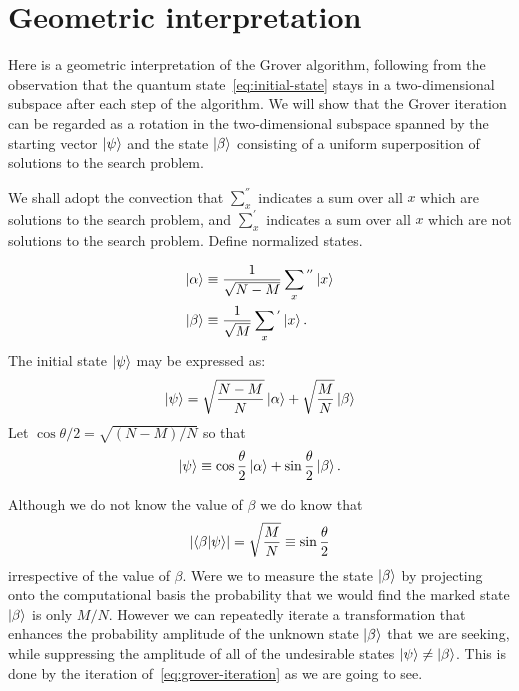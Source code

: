 \section{Geometric interpretation}\label{sec:geometric-interpretation}
Here is a geometric interpretation of the Grover algorithm, following from the observation that the quantum state~\ref{eq:initial-state} stays in a two-dimensional subspace after each step of the algorithm. We will show that the Grover iteration can be regarded as a rotation in the two-dimensional subspace spanned by the starting vector $\ket{\psi}$ and the state $\ket{\beta}$ consisting of a uniform superposition of solutions to the search problem. 

We shall adopt the convection that $\sum_{x}^{''}$ indicates a sum over all $x$ which are solutions to the search problem, and $\sum_{x}^{'}$ indicates a sum over all $x$ which are not solutions to the search problem. Define normalized states.

\begin{equation*}
\begin{split}
 \ket{\alpha} &\equiv \frac{1}{\sqrt{N-M}} \sum_{x}{}^{''} \ket{x} \\
 \ket{\beta} &\equiv \frac{1}{\sqrt{M}} \sum_{x}{}^{'} \ket{x}.
\end{split}
\end{equation*}
The initial state $\ket{\psi}$ may be expressed as:
\begin{equation*}
    \ket{\psi} = \sqrt{\frac{N-M}{N}} \ket{\alpha} + \sqrt{\frac{M}{N}} \ket{\beta}
\end{equation*}
 Let $\cos\theta/2 = \sqrt{(N-M)/N}$ so that 
 \begin{equation*}
 \ket{\psi} \equiv \cos\frac{\theta}{2}\ket{\alpha} + \sin\frac{\theta}{2}\ket{\beta}.
 \end{equation*}
 
Although we do not know the value of $\beta$ we do know that 
\begin{equation}
    \lvert\braket{\beta | \psi}\rvert = \sqrt{\frac{M}{N}} \equiv \sin\frac{\theta}{2}
\end{equation}
irrespective of the value of $\beta$. Were we to measure the state $\ket{\beta}$ by projecting onto the computational basis the probability that we would find the marked state $\ket{\beta}$ is only $M/N$.  However we can repeatedly iterate a transformation that enhances the probability amplitude of the unknown state $\ket{\beta}$ that we are seeking, while suppressing the amplitude of all of the
undesirable states $\ket{\psi} \neq \ket{\beta}$. This is done by the iteration of~\ref{eq:grover-iteration} as we are going to see.

